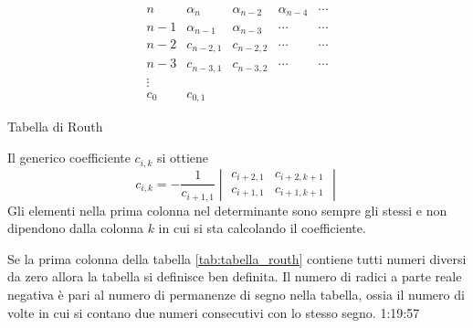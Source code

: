 \begin{table}[h]
$$
\begin{array}{c|ccccc}
 n & \alpha_n & \alpha_{n-2} & \alpha_{n-4} & \cdots \\
 n-1 & \alpha_{n-1} & \alpha_{n-3} & \cdots & \cdots \\ \hline
 n-2 & c_{n-2,1} & c_{n-2,2} & \cdots & \cdots \\
 n-3 & c_{n-3,1} & c_{n-3,2} & \cdots & \cdots\\
 \vdots \\
c_0 & c_{0,1}
\end{array}
$$
\caption{Tabella di Routh}
\label{tab:tabella_routh}
\end{table}
Il generico coefficiente $c_{i,k}$ si ottiene
$$
c_{i,k} = -\frac{1}{c_{i+1,1}}\begin{vmatrix}
c_{i+2,1} & c_{i+2,k+1} \\
c_{i+1,1} & c_{i+1,k+1}
\end{vmatrix}
$$
Gli elementi nella prima colonna nel determinante sono sempre gli stessi e non
dipendono dalla colonna $k$ in cui si sta calcolando il coefficiente.

Se la prima colonna della tabella \ref{tab:tabella_routh} contiene tutti numeri
diversi da zero allora la tabella si definisce ben definita.
Il numero di radici a parte reale negativa è pari al numero di permanenze di
segno nella tabella, ossia il numero di volte in cui si contano due numeri
consecutivi con lo stesso segno.
1:19:57
